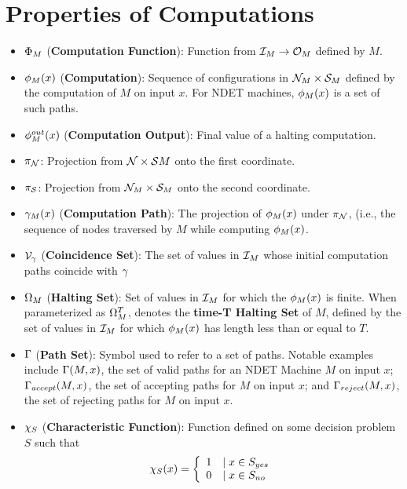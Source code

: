 \section{Properties of Computations}
\begin{itemize}
\item $\Phi_M$ (\textbf{Computation Function}): Function from
  $\mathcal{I}_M \rightarrow \mathcal{O}_M$ defined by $M$.
\item $\phi_M(x)$ (\textbf{Computation}): Sequence of
  configurations in $\mathcal{N}_M \times \mathcal{S}_M$ defined by the computation of $M$
  on input $x$.  For NDET machines, $\phi_M(x)$ is a set of such
  paths.
\item $\phi_{M}^{out}(x)$ (\textbf{Computation Output}): Final value
  of a halting computation.
\item $\pi_{\mathcal{N}}$: Projection from $\mathcal{N} \times \mathcal{S}{M}$ onto the
  first coordinate.
\item $\pi_{\mathcal{S}}$: Projection from $\mathcal{N}_M \times \mathcal{S}_M$ onto the
  second coordinate.
\item $\gamma_M(x)$ (\textbf{Computation Path}): The projection
  of $\phi_M(x)$ under $\pi_{\mathcal{N}}$, (i.e., the sequence of
  nodes traversed by $M$ while computing $\phi_M(x)$.
\item $\mathcal{V}_{\gamma}$ (\textbf{Coincidence Set}): The set
  of values in $\mathcal{I}_M$ whose initial computation paths coincide
  with $\gamma$
\item $\Omega_M$ (\textbf{Halting Set}): Set of values in
  $\mathcal{I}_M$ for which the $\phi_M(x)$ is finite.  When
  parameterized as $\Omega_M^T$, denotes the \textbf{time-T Halting
    Set} of $M$, defined by the set of values in $\mathcal{I}_M$ for
  which $\phi_M(x)$ has length less than or equal to $T$.
\item $\Gamma$ (\textbf{Path Set}): Symbol used to refer to a set
  of paths.  Notable examples include $\Gamma(M, x)$, the set of
  valid paths for an NDET Machine $M$ on input $x$; $\Gamma_{accept}(M, x)$,
  the set of accepting paths for $M$ on input $x$; and $\Gamma_{reject}(M,
  x)$, the set of rejecting paths for $M$ on input $x$.
\item $\chi_S$ (\textbf{Characteristic Function}): Function
  defined on some decision problem $S$ such that $$\chi_S(x) =
  \left\{ \begin{array}{ll} 1 & \mid x \in S_{yes} \\ 0 & \mid x \in S_{no} \end{array} \right.$$
\end{itemize}
